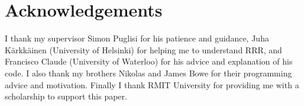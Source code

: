 \section{Acknowledgements}

I thank my supervisor Simon Puglisi for his patience and guidance,
Juha K\"{a}rkk\"{a}inen (University of Helsinki) for helping me to understand 
RRR, and Francisco Claude (University of Waterloo) for his advice and 
explanation of his code. I also thank my brothers Nikolas and James Bowe for 
their programming advice and motivation. Finally I thank RMIT University
for providing me with a scholarship to support this paper.
